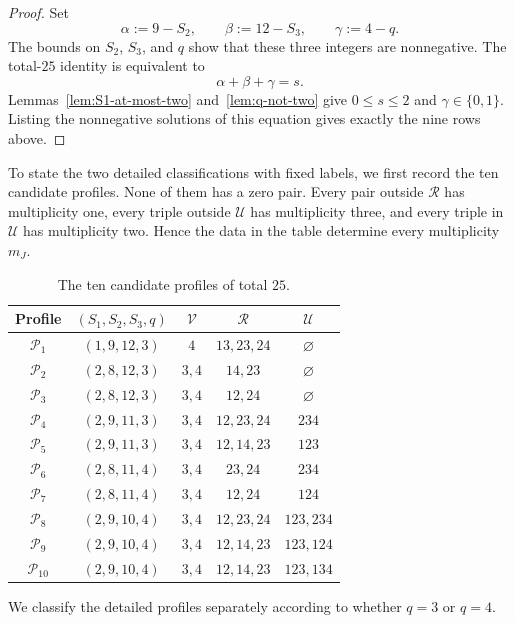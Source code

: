 \documentclass[11pt,a4paper]{article}
\theoremstyle{definition}
\begin{document}
\begin{proof}
Set
$$
\alpha:=9-S_2,\qquad
\beta:=12-S_3,\qquad
\gamma:=4-q.
$$
The bounds on $S_2$, $S_3$, and $q$ show that these three integers are
nonnegative.
The total-$25$ identity is equivalent to
$$
\alpha+\beta+\gamma=s.
$$
Lemmas~\ref{lem:S1-at-most-two} and~\ref{lem:q-not-two} give
$0\leq s\leq2$ and $\gamma\in\{0,1\}$. Listing the nonnegative solutions
of this equation gives exactly the nine rows above.
\end{proof}

To state the two detailed classifications with fixed labels, we first
record the ten candidate profiles. None of them has a zero pair. Every
pair outside $\mathcal R$ has multiplicity one, every triple outside
$\mathcal U$ has multiplicity three, and every triple in
$\mathcal U$ has multiplicity two. Hence the data in the table
determine every multiplicity $m_J$.

\begin{table}[ht]
\centering
\small
\caption{The ten candidate profiles of total $25$.}
\label{tab:ten-profiles}
\begin{tabular}{ccccc}
\toprule
Profile & $(S_1,S_2,S_3,q)$ & $\mathcal V$ & $\mathcal R$
& $\mathcal U$\\
\midrule
$\mathcal P_1$ & $(1,9,12,3)$ & $4$ & $13,23,24$ & $\varnothing$\\
$\mathcal P_2$ & $(2,8,12,3)$ & $3,4$ & $14,23$ & $\varnothing$\\
$\mathcal P_3$ & $(2,8,12,3)$ & $3,4$ & $12,24$ & $\varnothing$\\
$\mathcal P_4$ & $(2,9,11,3)$ & $3,4$ & $12,23,24$ & $234$\\
$\mathcal P_5$ & $(2,9,11,3)$ & $3,4$ & $12,14,23$ & $123$\\
\addlinespace
$\mathcal P_6$ & $(2,8,11,4)$ & $3,4$ & $23,24$ & $234$\\
$\mathcal P_7$ & $(2,8,11,4)$ & $3,4$ & $12,24$ & $124$\\
$\mathcal P_8$ & $(2,9,10,4)$ & $3,4$ & $12,23,24$ & $123,234$\\
$\mathcal P_9$ & $(2,9,10,4)$ & $3,4$ & $12,14,23$ & $123,124$\\
$\mathcal P_{10}$ & $(2,9,10,4)$ & $3,4$ & $12,14,23$ & $123,134$\\
\bottomrule
\end{tabular}
\end{table}

We classify the detailed profiles separately according to whether
$q=3$ or $q=4$.
\end{document}
